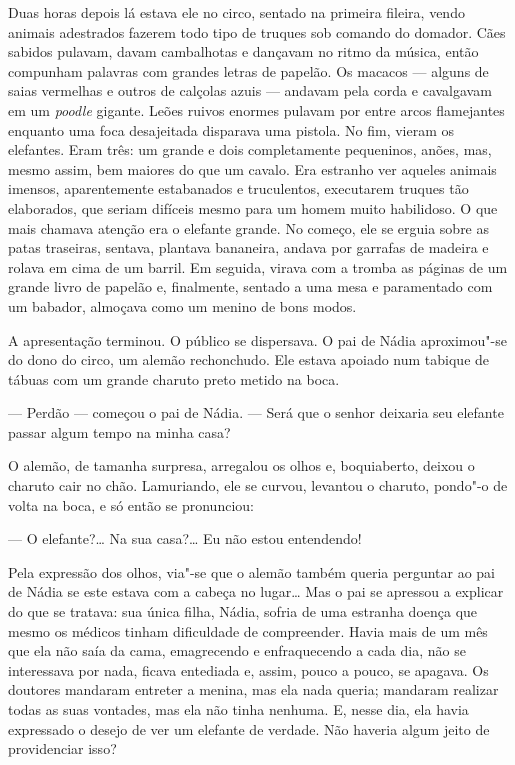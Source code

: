 Duas horas depois lá estava ele no circo, sentado na primeira fileira,
vendo animais adestrados fazerem todo tipo de truques sob comando do
domador. Cães sabidos pulavam, davam cambalhotas e dançavam no ritmo da
música, então compunham palavras com grandes letras de papelão. Os
macacos --- alguns de saias vermelhas e outros de calçolas azuis ---
andavam pela corda e cavalgavam em um \emph{poodle} gigante. Leões
ruivos enormes pulavam por entre arcos flamejantes enquanto uma foca
desajeitada disparava uma pistola. No fim, vieram os elefantes. Eram
três: um grande e dois completamente pequeninos, anões, mas, mesmo
assim, bem maiores do que um cavalo. Era estranho ver aqueles animais
imensos, aparentemente estabanados e truculentos, executarem truques
tão elaborados, que seriam difíceis mesmo para um homem muito
habilidoso. O que mais chamava atenção era o elefante grande. No
começo, ele se erguia sobre as patas traseiras, sentava, plantava
bananeira, andava por garrafas de madeira e rolava em cima de um
barril. Em seguida, virava com a tromba as páginas de um grande livro de
papelão e, finalmente, sentado a uma mesa e paramentado com um babador,
almoçava como um menino de bons modos.

A apresentação terminou. O público se dispersava. O pai de Nádia
aproximou"-se do dono do circo, um alemão rechonchudo. Ele estava apoiado
num tabique de tábuas com um grande charuto preto metido na boca.

--- Perdão --- começou o pai de Nádia. --- Será que o senhor deixaria
seu elefante passar algum tempo na minha casa?

O alemão, de tamanha surpresa, arregalou os olhos e, boquiaberto, deixou
o charuto cair no chão. Lamuriando, ele se curvou, levantou o charuto,
pondo"-o de volta na boca, e só então se pronunciou:

--- O elefante?\ldots{} Na sua casa?\ldots{} Eu não estou entendendo!

Pela expressão dos olhos, via"-se que o alemão também queria perguntar ao
pai de Nádia se este estava com a cabeça no lugar\ldots{} Mas o pai se
apressou a explicar do que se tratava: sua única filha, Nádia, sofria de
uma estranha doença que mesmo os médicos tinham dificuldade de
compreender. Havia mais de um mês que ela não saía da cama, emagrecendo
e enfraquecendo a cada dia, não se interessava por nada, ficava
entediada e, assim, pouco a pouco, se apagava. Os doutores mandaram
entreter a menina, mas ela nada queria; mandaram realizar todas as suas
vontades, mas ela não tinha nenhuma. E, nesse dia, ela havia expressado
o desejo de ver um elefante de verdade. Não haveria algum jeito de
providenciar isso?

